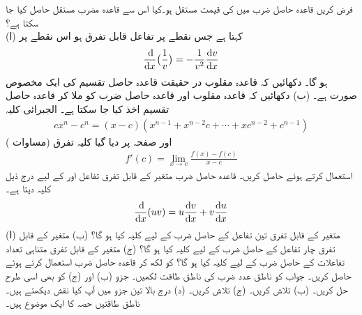 فرض کریں   قاعدہ حاصل ضرب میں  کی قیمت مستقل  ہو۔کیا اس سے قاعدہ مضرب مستقل حاصل کیا جا سکتا ہے؟
\\
(ا)  کہتا ہے  جس نقطے پر تفاعل  قابل تفرق ہو اس نقطے پر 
\begin{align*}
\frac{\dif}{\dif x}\big(\frac{1}{v}\big)=-\frac{1}{v^2}\frac{\dif v}{\dif x}
\end{align*}
ہو گا۔ دکھائیں کہ قاعدہ مقلوب در حقیقت قاعدہ حاصل تقسیم کی ایک مخصوص صورت ہے۔ (ب) دکھائیں کہ قاعدہ مقلوب اور قاعدہ حاصل ضرب کو ملا کر قاعدہ حاصل تقسیم  اخذ کیا جا سکتا ہے۔
\quad
الجبرائی کلیہ
\begin{align*}
cx^n-c^n=(x-c)(x^{n-1}+x^{n-2}c+\cdots+xc^{n-2}+c^{n-1})
\end{align*}
اور صفحہ  پر دیا گیا کلیہ تفرق (مساوات )
\begin{align*}
f'(c)=\lim_{x\to c} \frac{f(x)-f(c)}{x-c}
\end{align*}
استعمال کرتے ہوئے  حاصل کریں۔
\quad
قاعدہ حاصل ضرب متغیر  کے قابل تفرق تفاعل  اور  کے لیے  درج ذیل کلیہ دیتا ہے۔
\begin{align*}
\frac{\dif}{\dif x}(uv)=u\frac{\dif v}{\dif x}+v\frac{\dif u}{\dif x}
\end{align*}
(ا) متغیر  کے قابل تفرق تین تفاعل کے حاصل ضرب  کے لیے کلیہ کیا ہو گا؟ (ب) متغیر  کے قابل تفرق چار تفاعل کے حاصل ضرب  کے لیے کلیہ کیا ہو گا؟ (ج) متغیر  کے قابل تفرق متناہی تعداد  تفاعلات  کے حاصل ضرب  کے لیے کلیہ کیا ہو گا؟
 کو  لکھ کر قاعدہ حاصل ضرب استعمال کرتے ہوئے  حاصل کریں۔ جواب کو ناطق عدد ضرب  کی  ناطق طاقت لکھیں۔ جزو (ب) اور (ج) کو بھی اسی طرح حل کریں۔ (ب)  تلاش کریں۔ (ج)  تلاش کریں۔ (د) درج بالا تین جزو میں آپ کیا نقش دیکھتے ہیں۔ ناطق طاقتیں حصہ  کا ایک موضوع ہیں۔


